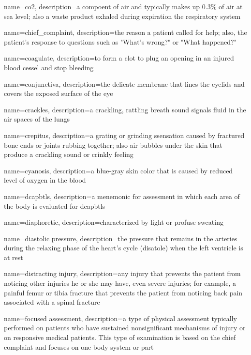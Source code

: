 \documentclass[../../EMT-169.tex]{subfiles}
\begin{document}
	{
		name=\acrfull{co2},
		description={a compoent of air and typically makes up 0.3\% of air at sea level; also a waste product exhaled during expiration the respiratory system}
	}

	{
		name=chief_complaint,
		description={the reason a patient called for help; also, the patient's response to questions such as "What's wrong?" or "What happened?"}
	}

	{
		name=coagulate,
		description={to form a clot to plug an opening in an injured blood cessel and stop bleeding}
	}

	{
		name=conjunctiva,
		description={the delicate membrane that lines the eyelids and covers the exposed surface of the eye}
	}

	{
		name=crackles,
		description={a crackling, rattling breath sound signals fluid in the air spaces of the lungs}
	}

	{
		name=crepitus,
		description={a grating or grinding ssensation caused by fractured bone ends or joints rubbing together;
		also air bubbles under the skin that produce a crackling sound or crinkly feeling}
	}

	{
		name=cyanosis,
		description={a blue-gray skin color that is caused by reduced level of oxygen in the blood}
	}

	{
		name=\acrshort{dcapbtls},
		description={a menemonic for assessment in which each area of the body is evaluated for \acrlong{dcapbtls}}
	}

	{
		name=diaphoretic,
		description={characterized by light or profuse sweating}
	}

	{
		name=diastolic pressure,
		description={the pressure that remains in the arteries during the relaxing phase of the heart's cycle (disatole) when the left ventricle is at rest}
	}

	{
		name=distracting injury,
		description={any injury that prevents the patient from noticing other injuries he or she may have, even severe injuries; for example, a painful femur or tibia fracture that prevents the patient from noticing back pain associated with a spinal fracture}
	}

	{
		name=focused assessment,
		description={a type of physical assessment typically performed on patients who have sustained nonsignificant mechanisms of injury or on responsive medical patients.  This type of examination is based on the chief complaint and focuses on one body system or part}
	}
\end{document}
